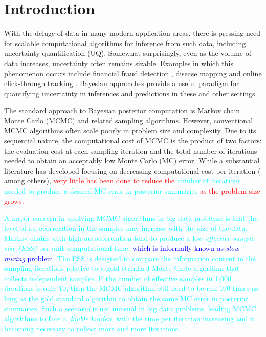 \documentclass[11pt]{article}
\newcommand{\leojames}[1]{\textcolor{blue}{#1}}
\newcommand{\leo}[1]{{\textcolor{red}{#1}}}
\newcommand{\dave}[1]{{\textcolor{cyan}{#1}}}
\begin{document}
\vfill

\newpage



\section{Introduction}

With the deluge of data in many modern application areas, there is pressing need for scalable computational algorithms for inference from such data, including uncertainty quantification (UQ).  Somewhat surprisingly, even as the volume of data increases, uncertainty often remains sizable.  Examples in which this phenomenon occurs include financial fraud detection \citep{ngai2011application}, disease mapping \citep{wakefield2007disease} and online click-through tracking \citep{wang2010click}.  Bayesian approaches provide a useful paradigm for quantifying uncertainty in inferences and predictions in these and other settings.

The standard approach to Bayesian posterior computation is Markov chain Monte Carlo (MCMC) and related sampling algorithms. However,  conventional MCMC algorithms often scale poorly in problem size and complexity. Due to its sequential nature, the computational cost of MCMC is the product of two factors: the evaluation cost at each sampling iteration and the total number of iterations needed to obtain an acceptably low Monte Carlo (MC) error. While a substantial literature has developed focusing on decreasing computational cost per iteration (\cite{minsker2014robust,maclaurin2014firefly,
srivastava2015wasp,conrad2015accelerating} among others), \leo{very little has been done
to reduce the} \dave{number of iterations needed to produce a desired MC error in posterior summaries} 
\leo{as the problem size grows.}

\dave{A major concern in applying MCMC algorithms in big data problems is that the level of autocorrelation in the samples may increase with the size of the data.  Markov chains with high autocorrelation 
tend to produce a low {\em effective sample size (ESS)} per unit computational time, \leojames{which is informally known as  {\em slow mixing} problem}.  The ESS is designed to compare the information content in the sampling iterations relative to a gold standard Monte Carlo algorithm that collects independent samples.  If the number of effective samples in 1,000 iterations is only 10, then the MCMC algorithm will need to be run 100 times as long as the gold standard algorithm to obtain the same MC error in posterior summaries.  Such a scenario is not unusual in big data problems, leading MCMC algorithms to face a {\em double burden}, with the time per iteration increasing and it becoming necessary to collect more and more iterations.} 
\end{document}
